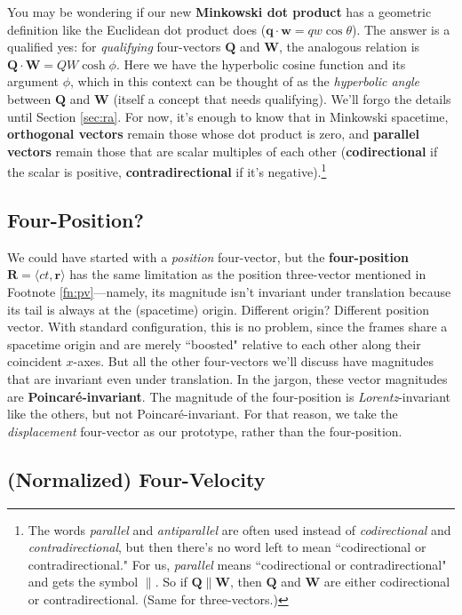 \documentclass[12pt]{article}
\renewcommand{\vv}[1]{\mathbf{#1}}
\begin{document}
You may be wondering if our new \textbf{Minkowski dot product} has a geometric definition like the Euclidean dot product does ($\vv q \cdot \vv w = qw \cos \theta$). The answer is a qualified yes: for \emph{qualifying} four-vectors $\vv Q$ and $\vv W$, the analogous relation is $\vv Q \cdot \vv W = QW \cosh \phi$. Here we have the hyperbolic cosine function and its argument $\phi$, which in this context can be thought of as the \emph{hyperbolic angle} between $\vv Q$ and $\vv W$ (itself a concept that needs qualifying). We'll forgo the details until Section \ref{sec:ra}. For now, it's enough to know that in Minkowski spacetime, \textbf{orthogonal vectors} remain those whose dot product is zero, and \textbf{parallel vectors} remain those that are scalar multiples of each other (\textbf{codirectional} if the scalar is positive, \textbf{contradirectional} if it's negative).\footnote{The words \emph{parallel} and \emph{antiparallel} are often used instead of \emph{codirectional} and \emph{contradirectional}, but then there's no word left to mean ``codirectional or contradirectional." For us, \emph{parallel} means ``codirectional or contradirectional" and gets the symbol $\parallel$. So if $\vv Q \parallel \vv W$, then $\vv Q$ and $\vv W$ are either codirectional or contradirectional. (Same for three-vectors.)}


\subsection{Four-Position?}

We could have started with a \emph{position} four-vector, but the \textbf{four-position} $\vv R = \langle ct, \vv r \rangle$ has the same limitation as the position three-vector mentioned in Footnote \ref{fn:pv}---namely, its magnitude isn't invariant under translation because its tail is always at the (spacetime) origin. Different origin? Different position vector. With standard configuration, this is no problem, since the frames share a spacetime origin and are merely ``boosted" relative to each other along their coincident $x$-axes. But all the other four-vectors we'll discuss have magnitudes that are invariant even under translation. In the jargon, these vector magnitudes are \textbf{Poincar\'e-invariant}. The magnitude of the four-position is \emph{Lorentz}-invariant like the others, but not Poincar\'e-invariant. For that reason, we take the \emph{displacement} four-vector as our prototype, rather than the four-position.


\subsection{(Normalized) Four-Velocity}
\end{document}
